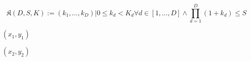 \documentclass{article}
\begin{document}
\[ \mathfrak{K}(D,S,K) := {(k_1,\dots,k_D) | 0 \leq k_d < K_d \forall d \in [1,\dots,D] \land \displaystyle\prod_{d=1}^{D} (1+k_d) \leq S} \]
\pagebreak

$(x_1,y_1)$
\pagebreak

$(x_2,y_2)$
\pagebreak
\end{document}
